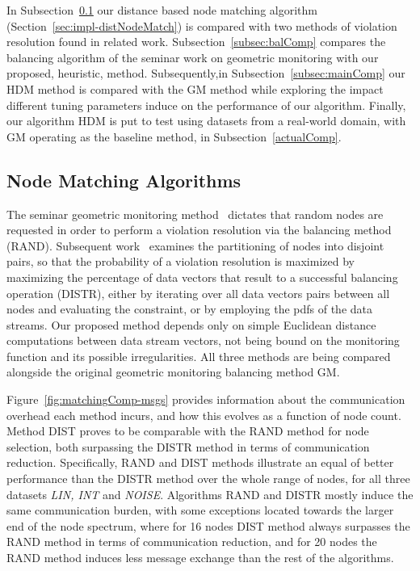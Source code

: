 In Subsection~\ref{subsec:matchingComp} our distance based node matching algorithm (Section~\ref{sec:impl-distNodeMatch}) is compared with two methods of violation resolution found in related work. Subsection~\ref{subsec:balComp} compares the balancing algorithm of the seminar work on geometric monitoring with our proposed, heuristic, method. Subsequently,in Subsection~\ref{subsec:mainComp} our HDM method is compared with the GM method while exploring the impact different tuning parameters induce on the performance of our algorithm. Finally, our algorithm HDM is put to test using datasets from a real-world domain, with GM operating as the baseline method, in Subsection~\ref{actualComp}.

\subsection{Node Matching Algorithms} \label{subsec:matchingComp}

The seminar geometric monitoring method~\cite{Sharfman2006GM} dictates that random nodes are requested in order to perform a violation resolution via the balancing method (RAND). Subsequent work~\cite{Keren2014GMHetStreams} examines the partitioning of nodes into disjoint pairs, so that the probability of a violation resolution is maximized by maximizing the percentage of data vectors that result to a successful balancing operation (DISTR), either by iterating over all data vectors pairs between all nodes and evaluating the constraint, or by employing the pdfs of the data streams. Our proposed method depends only on simple Euclidean distance computations between data stream vectors, not being bound on the monitoring function and its possible irregularities. All three methods are being compared alongside the original geometric monitoring balancing method GM.

Figure~\ref{fig:matchingComp-msgs} provides information about the communication overhead each method incurs, and how this evolves as a function of node count. Method DIST proves to be comparable with the RAND method for node selection, both surpassing the DISTR method in terms of communication reduction. Specifically, RAND and DIST methods illustrate an equal of better performance than the DISTR method over the whole range of nodes, for all three datasets \emph{LIN, INT} and \emph{NOISE}. Algorithms RAND and DISTR mostly induce the same communication burden, with some exceptions located towards the larger end of the node spectrum, where for 16 nodes DIST method always surpasses the RAND method in terms of communication reduction, and for 20 nodes the RAND method induces less message exchange than the rest of the algorithms.

